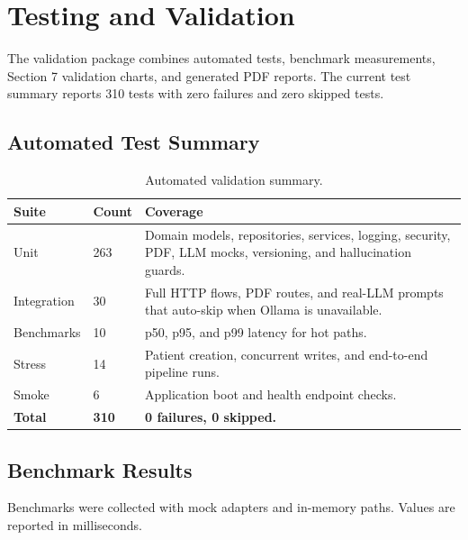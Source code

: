 \section{Testing and Validation}

The validation package combines automated tests, benchmark measurements, Section 7 validation charts, and generated PDF reports. The current test summary reports 310 tests with zero failures and zero skipped tests.

\subsection{Automated Test Summary}

\begin{table}[h]
\centering
\begin{tabularx}{\textwidth}{@{}L{0.22\textwidth}L{0.14\textwidth}Y@{}}
\toprule
\textbf{Suite} & \textbf{Count} & \textbf{Coverage} \\
\midrule
Unit & 263 & Domain models, repositories, services, logging, security, PDF, LLM mocks, versioning, and hallucination guards. \\
Integration & 30 & Full HTTP flows, PDF routes, and real-LLM prompts that auto-skip when Ollama is unavailable. \\
Benchmarks & 10 & p50, p95, and p99 latency for hot paths. \\
Stress & 14 & Patient creation, concurrent writes, and end-to-end pipeline runs. \\
Smoke & 6 & Application boot and health endpoint checks. \\
\midrule
\textbf{Total} & \textbf{310} & \textbf{0 failures, 0 skipped.} \\
\bottomrule
\end{tabularx}
\caption{Automated validation summary.}
\end{table}

\subsection{Benchmark Results}

Benchmarks were collected with mock adapters and in-memory paths. Values are reported in milliseconds.

